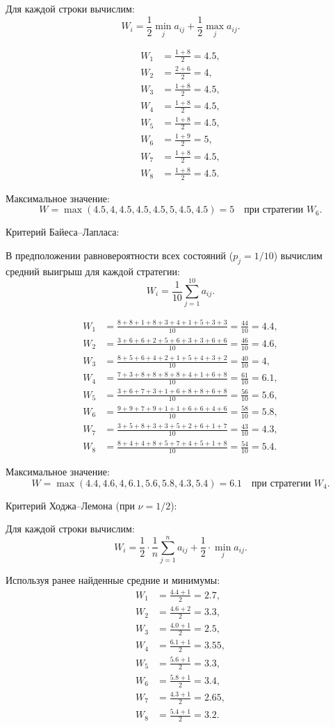 Для каждой строки вычислим:
\[
W_i = \frac{1}{2} \min_j a_{ij} + \frac{1}{2} \max_j a_{ij}.
\]

\begin{align*}
W_1 &= \frac{1 + 8}{2} = 4.5, \\
W_2 &= \frac{2 + 6}{2} = 4, \\
W_3 &= \frac{1 + 8}{2} = 4.5, \\
W_4 &= \frac{1 + 8}{2} = 4.5, \\
W_5 &= \frac{1 + 8}{2} = 4.5, \\
W_6 &= \frac{1 + 9}{2} = 5, \\
W_7 &= \frac{1 + 8}{2} = 4.5, \\
W_8 &= \frac{1 + 8}{2} = 4.5.
\end{align*}

Максимальное значение:
\[
W = \max(4.5, 4, 4.5, 4.5, 4.5, 5, 4.5, 4.5) = 5 \quad \text{при стратегии } W_6.
\]

Критерий Байеса--Лапласа:

В предположении равновероятности всех состояний ($p_j = 1/10$) вычислим средний выигрыш для каждой стратегии:
\[
W_i = \frac{1}{10} \sum_{j=1}^{10} a_{ij}.
\]

\begin{align*}
W_1 &= \frac{8+8+1+8+3+4+1+5+3+3}{10} = \frac{44}{10} = 4.4, \\
W_2 &= \frac{3+6+6+2+5+6+3+3+6+6}{10} = \frac{46}{10} = 4.6, \\
W_3 &= \frac{8+5+6+4+2+1+5+4+3+2}{10} = \frac{40}{10} = 4, \\
W_4 &= \frac{7+3+8+8+8+8+4+1+6+8}{10} = \frac{61}{10} = 6.1, \\
W_5 &= \frac{3+6+7+3+1+6+8+8+6+8}{10} = \frac{56}{10} = 5.6, \\
W_6 &= \frac{9+9+7+9+1+1+6+6+4+6}{10} = \frac{58}{10} = 5.8, \\
W_7 &= \frac{3+5+8+3+3+5+2+6+1+7}{10} = \frac{43}{10} = 4.3, \\
W_8 &= \frac{8+4+4+8+5+7+4+5+1+8}{10} = \frac{54}{10} = 5.4.
\end{align*}

Максимальное значение:
\[
W = \max(4.4, 4.6, 4, 6.1, 5.6, 5.8, 4.3, 5.4) = 6.1 \quad \text{при стратегии } W_4.
\]

Критерий Ходжа--Лемона (при $\nu = 1/2$):

Для каждой строки вычислим:
\[
W_i = \frac{1}{2} \cdot \frac{1}{n} \sum_{j=1}^{n} a_{ij} + \frac{1}{2} \cdot \min_j a_{ij}.
\]

Используя ранее найденные средние и минимумы:
\begin{align*}
W_1 &= \frac{4.4 + 1}{2} = 2.7, \\
W_2 &= \frac{4.6 + 2}{2} = 3.3, \\
W_3 &= \frac{4.0 + 1}{2} = 2.5, \\
W_4 &= \frac{6.1 + 1}{2} = 3.55, \\
W_5 &= \frac{5.6 + 1}{2} = 3.3, \\
W_6 &= \frac{5.8 + 1}{2} = 3.4, \\
W_7 &= \frac{4.3 + 1}{2} = 2.65, \\
W_8 &= \frac{5.4 + 1}{2} = 3.2.
\end{align*}

